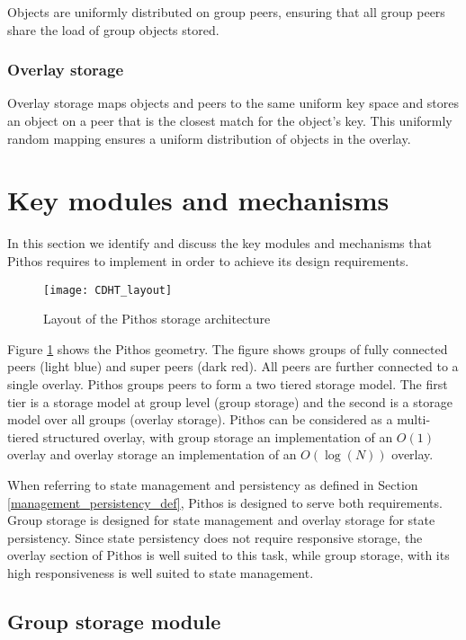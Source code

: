 Objects are uniformly distributed on group peers, ensuring that all group peers share the load of group objects stored.

\subsubsection{Overlay storage}

Overlay storage maps objects and peers to the same uniform key space and stores an object on a peer that is the closest match for the object's key. This uniformly random mapping ensures a uniform distribution of objects in the overlay.

\section{Key modules and mechanisms}
\label{key_modules_mechs}

In this section we identify and discuss the key modules and mechanisms that Pithos requires to implement in order to achieve its design requirements.

\begin{figure}[htbp]
 \centering
 \texttt{[image: CDHT\_layout]}
 \caption{Layout of the Pithos storage architecture}
 \label{fig_pithos}
\end{figure}
%
Figure \ref{fig_pithos} shows the Pithos geometry. The figure shows groups of fully connected peers (light blue) and super peers (dark red). All peers are further connected to a single overlay. Pithos groups peers to form a two tiered storage model. The first tier is a storage model at group level (group storage) and the second is a storage model over all groups (overlay storage). Pithos can be considered as a multi-tiered structured overlay, with group storage an implementation of an $O(1)$ overlay and overlay storage an implementation of an $O(\log (N))$ overlay.

When referring to state management and persistency as defined in Section \ref{management_persistency_def}, Pithos is designed to serve both requirements. Group storage is designed for state management and overlay storage for state persistency. Since state persistency does not require responsive storage, the overlay section of Pithos is well suited to this task, while group storage, with its high responsiveness is well suited to state management.

\subsection{Group storage module}

